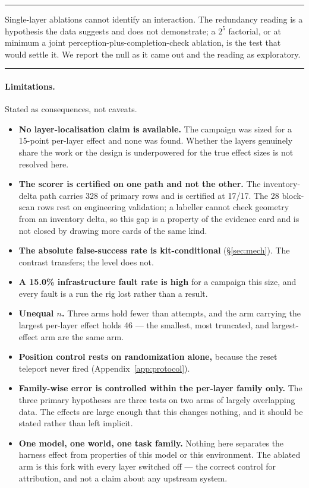 \documentclass[11pt]{article}
\newcommand{\runin}[1]{\paragraph{#1}}
\newenvironment{callout}[1]
  {\par\medskip\noindent\rule{\linewidth}{0.9pt}\par\nobreak\smallskip
   \noindent{\footnotesize\textsc{#1}}\par\nobreak\smallskip\small}
  {\par\smallskip\noindent\rule{\linewidth}{0.4pt}\par\medskip}
\begin{document}
\begin{callout}{What this is not}
Single-layer ablations cannot identify an interaction. The redundancy
reading is a hypothesis the data suggests and does not demonstrate; a
$2^5$ factorial, or at minimum a joint perception-plus-completion-check
ablation, is the test that would settle it. We report the null as it
came out and the reading as exploratory.
\end{callout}

\runin{Limitations.}
Stated as consequences, not caveats.

\begin{itemize}[leftmargin=1.3em,itemsep=.3em]
\item \textbf{No layer-localisation claim is available.} The campaign
  was sized for a 15-point per-layer effect and none was found. Whether
  the layers genuinely share the work or the design is underpowered for
  the true effect sizes is not resolved here.
\item \textbf{The scorer is certified on one path and not the other.}
  The inventory-delta path carries 328 of \NPrimary{} primary rows and
  is certified at 17/17. The 28 block-scan rows rest on engineering
  validation; a labeller cannot check geometry from an inventory delta,
  so this gap is a property of the evidence card and is not closed by
  drawing more cards of the same kind.
\item \textbf{The absolute false-success rate is kit-conditional}
  (\S\ref{sec:mech}). The contrast transfers; the level does not.
\item \textbf{A 15.0\% infrastructure fault rate is high} for a
  campaign this size, and every fault is a run the rig lost rather than
  a result.
\item \textbf{Unequal $n$.} Three arms hold fewer than \OnN{} attempts,
  and the arm carrying the largest per-layer effect holds 46 --- the
  smallest, most truncated, and largest-effect arm are the same arm.
\item \textbf{Position control rests on randomization alone,} because
  the reset teleport never fired (Appendix~\ref{app:protocol}).
\item \textbf{Family-wise error is controlled within the per-layer
  family only.} The three primary hypotheses are three tests on two
  arms of largely overlapping data. The effects are large enough that
  this changes nothing, and it should be stated rather than left
  implicit.
\item \textbf{One model, one world, one task family.} Nothing here
  separates the harness effect from properties of this model or this
  environment. The ablated arm is this fork with every layer switched
  off --- the correct control for attribution, and not a claim about any
  upstream system.
\end{itemize}
\end{document}
